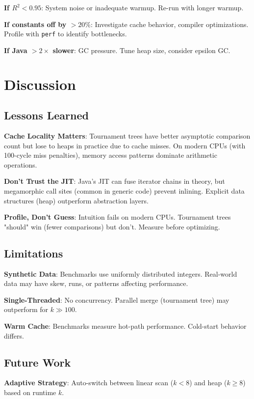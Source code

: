 \documentclass[11pt]{article}
\begin{document}
\textbf{If $R^2 < 0.95$}: System noise or inadequate warmup. Re-run with longer warmup.

\textbf{If constants off by $>20\%$}: Investigate cache behavior, compiler optimizations. Profile with \texttt{perf} to identify bottlenecks.

\textbf{If Java $>2\times$ slower}: GC pressure. Tune heap size, consider epsilon GC.

\section{Discussion}

\subsection{Lessons Learned}

\textbf{Cache Locality Matters}: Tournament trees have better asymptotic comparison count but lose to heaps in practice due to cache misses. On modern CPUs (with 100-cycle miss penalties), memory access patterns dominate arithmetic operations.

\textbf{Don't Trust the JIT}: Java's JIT can fuse iterator chains in theory, but megamorphic call sites (common in generic code) prevent inlining. Explicit data structures (heap) outperform abstraction layers.

\textbf{Profile, Don't Guess}: Intuition fails on modern CPUs. Tournament trees "should" win (fewer comparisons) but don't. Measure before optimizing.

\subsection{Limitations}

\textbf{Synthetic Data}: Benchmarks use uniformly distributed integers. Real-world data may have skew, runs, or patterns affecting performance.

\textbf{Single-Threaded}: No concurrency. Parallel merge (tournament tree) may outperform for $k \gg 100$.

\textbf{Warm Cache}: Benchmarks measure hot-path performance. Cold-start behavior differs.

\subsection{Future Work}

\textbf{Adaptive Strategy}: Auto-switch between linear scan ($k < 8$) and heap ($k \geq 8$) based on runtime $k$.
\end{document}
